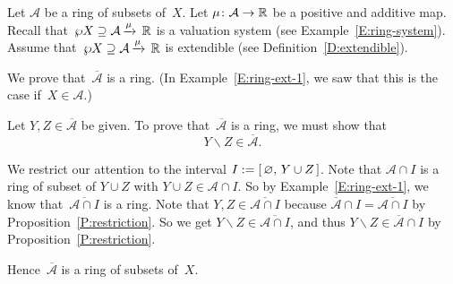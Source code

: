 \documentclass[main.tex]{subfiles}
\begin{document}
%
%
\begin{ex}
\label{E:ring-ext-2}
Let $\mathcal{A}$
be a ring of subsets of~$X$.
Let $\mu\colon \mathcal A \rightarrow \mathbb{R}$
be a positive and additive map.
Recall that~$\wp X \supseteq \mathcal{A}\,\smash{\xrightarrow{\mu}\,\mathbb{R}}$
is a valuation system (see Example~\ref{E:ring-system}).
Assume that~$\wp X \supseteq \mathcal{A}\,\smash{\xrightarrow{\mu}\,\mathbb{R}}$
is extendible
(see Definition~\ref{D:extendible}).

We prove that~$\overline{\mathcal{A}}$ is a ring.
(In Example~\ref{E:ring-ext-1},
we saw that this
is the case if~$X\in \mathcal{A}$.)

Let $Y,Z\in\overline{\mathcal{A}}$ be given.
To prove that~$\overline{\mathcal{A}}$
is a ring,
we must show that
\begin{equation*}
Y\backslash Z\in\overline{\mathcal{A}}.
\end{equation*}

We restrict our attention to the interval $I:= [\,\varnothing,\, Y\cup Z\,]$.
Note that $\mathcal{A}\cap I$ is a ring of subset of $Y\cup Z$
with $Y\cup Z\in\mathcal{A}\cap I$.
So by Example~\ref{E:ring-ext-1},
we know that~$\overline{\mathcal{A}\cap I}$ is a ring.
Note that 
$Y,Z\in\overline{\mathcal{A}\cap I}$
because $\overline{\mathcal A} \cap I 
= \overline{ \mathcal A \cap I}$
by Proposition~\ref{P:restriction}.
So we get $Y\backslash Z\in \overline{\mathcal{A}\cap I}$,
and thus $Y\backslash Z\in \overline{\mathcal{A}}\cap I$
by Proposition~\ref{P:restriction}.

Hence~$\overline{\mathcal{A}}$ is a ring of subsets of~$X$.
\end{ex}
\end{document}
